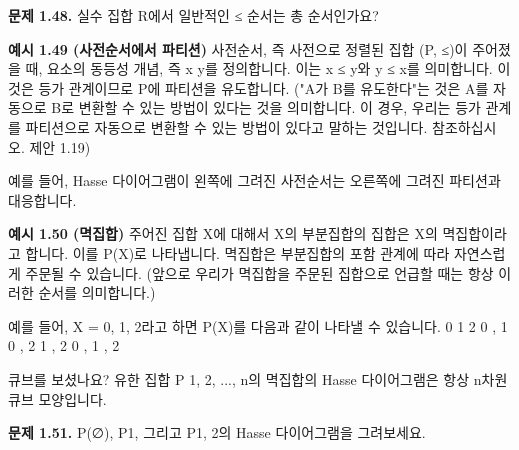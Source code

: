 \documentclass[11pt, a4paper, twoside, openany]{book}
\begin{document}
\par\medskip
\textbf{문제 1.48.}
실수 집합 R\hspace{0pt}에서 일반적인 ≤ 순서는 총 순서인가요?

\par\medskip
\textbf{예시 1.49 (사전순서에서 파티션)}
사전순서, 즉 사전으로 정렬된 집합 (P, ≤)이 주어졌을 때, 요소의 동등성 개념, 즉 x  y\hspace{0pt}를 정의합니다. 이는 x ≤ y\hspace{0pt}와 y ≤ x\hspace{0pt}를 의미합니다. 이것은 등가 관계이므로 P\hspace{0pt}에 파티션을 유도합니다. ("A\hspace{0pt}가 B\hspace{0pt}를 유도한다"는 것은 A\hspace{0pt}를 자동으로 B\hspace{0pt}로 변환할 수 있는 방법이 있다는 것을 의미합니다. 이 경우, 우리는 등가 관계를 파티션으로 자동으로 변환할 수 있는 방법이 있다고 말하는 것입니다. 참조하십시오. 제안 1.19)

\par\medskip
예를 들어, Hasse 다이어그램이 왼쪽에 그려진 사전순서는 오른쪽에 그려진 파티션과 대응합니다.

\par\medskip
\textbf{예시 1.50 (멱집합)}
주어진 집합 X\hspace{0pt}에 대해서 X\hspace{0pt}의 부분집합의 집합은 X\hspace{0pt}의 멱집합이라고 합니다. 이를 P(X)로 나타냅니다. 멱집합은 부분집합의 포함 관계에 따라 자연스럽게 주문될 수 있습니다. (앞으로 우리가 멱집합을 주문된 집합으로 언급할 때는 항상 이러한 순서를 의미합니다.)

\par\medskip
예를 들어, X = {0, 1, 2}라고 하면 P(X)를 다음과 같이 나타낼 수 있습니다.
{ }
{ 0 }
{ 1 }
{ 2 }
{ 0 , 1 }
{ 0 , 2 }
{ 1 , 2 }
{ 0 , 1 , 2 }

\par\medskip
큐브를 보셨나요? 유한 집합 P {1, 2, ..., n}의 멱집합의 Hasse 다이어그램은 항상 n\hspace{0pt}차원 큐브 모양입니다.

\par\medskip
\textbf{문제 1.51.}
P(∅), P{1}, 그리고 P{1, 2}의 Hasse 다이어그램을 그려보세요.
\end{document}
